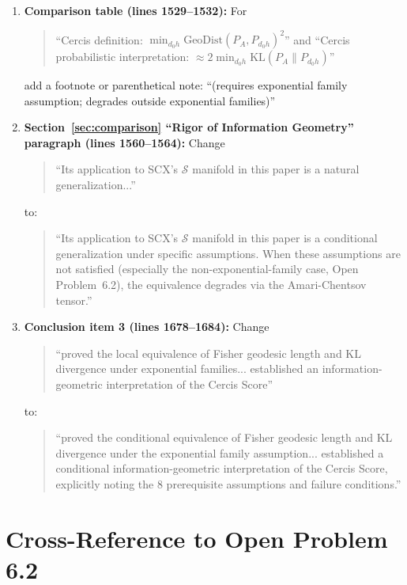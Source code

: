 \documentclass{article}
\newcommand{\GeoDist}{\mathrm{GeoDist}}
\newcommand{\KL}{\mathrm{KL}}
\newcommand{\Situs}{\mathcal{S}}
\begin{document}
\begin{enumerate}[label=(\arabic*)]
    \item \textbf{Comparison table (lines 1529--1532):}
    For
    \begin{quote}
        ``Cercis definition: $\min_{d_0 h} \GeoDist(P_A, P_{d_0 h})^2$'' and
        ``Cercis probabilistic interpretation: $\approx 2\min_{d_0 h} \KL(P_A \| P_{d_0 h})$''
    \end{quote}
    add a footnote or parenthetical note: ``(requires exponential family assumption; degrades outside exponential families)''

    \item \textbf{Section~\ref{sec:comparison} ``Rigor of Information Geometry'' paragraph (lines 1560--1564):}
    Change
    \begin{quote}
        ``Its application to SCX's $\Situs$ manifold in this paper is a natural generalization...''
    \end{quote}
    to:
    \begin{quote}
        ``Its application to SCX's $\Situs$ manifold in this paper is a conditional generalization under specific assumptions.
        When these assumptions are not satisfied (especially the non-exponential-family case, Open Problem~6.2), the equivalence degrades via the Amari-Chentsov tensor.''
    \end{quote}

    \item \textbf{Conclusion item 3 (lines 1678--1684):}
    Change
    \begin{quote}
        ``proved the local equivalence of Fisher geodesic length and KL divergence under exponential families... established an information-geometric interpretation of the Cercis Score''
    \end{quote}
    to:
    \begin{quote}
        ``proved the conditional equivalence of Fisher geodesic length and KL divergence under the exponential family assumption... established a conditional information-geometric interpretation of the Cercis Score, explicitly noting the 8 prerequisite assumptions and failure conditions.''
    \end{quote}

\end{enumerate}

\section{Cross-Reference to Open Problem 6.2}
\end{document}
